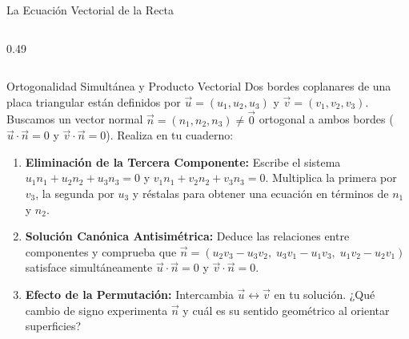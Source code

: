 \documentclass[10pt,aspectratio=169]{beamer}
\begin{document}
\begin{frame}{La Ecuación Vectorial de la Recta}
\begin{columns}[c]
\begin{column}{0.49\textwidth}
    \end{column}
  \end{columns}
\end{frame}

\begin{frame}{Ortogonalidad Simultánea y Producto Vectorial}
  \vspace{0.05cm}
  Dos bordes coplanares de una placa triangular están definidos por $\vec{u} = (u_1, u_2, u_3)$ y $\vec{v} = (v_1, v_2, v_3)$. Buscamos un vector normal $\vec{n} = (n_1, n_2, n_3) \neq \vec{0}$ ortogonal a ambos bordes ($\vec{u}\cdot\vec{n} = 0$ y $\vec{v}\cdot\vec{n} = 0$). Realiza en tu cuaderno:
  \vspace{0.25cm}
  \begin{enumerate}\itemsep10pt
    \item[(a)] \textbf{Eliminación de la Tercera Componente:} Escribe el sistema $u_1 n_1 + u_2 n_2 + u_3 n_3 = 0$ y $v_1 n_1 + v_2 n_2 + v_3 n_3 = 0$. Multiplica la primera por $v_3$, la segunda por $u_3$ y réstalas para obtener una ecuación en términos de $n_1$ y $n_2$.
    \item[(b)] \textbf{Solución Canónica Antisimétrica:} Deduce las relaciones entre componentes y comprueba que $\vec{n} = (u_2 v_3 - u_3 v_2,\; u_3 v_1 - u_1 v_3,\; u_1 v_2 - u_2 v_1)$ satisface simultáneamente $\vec{u}\cdot\vec{n} = 0$ y $\vec{v}\cdot\vec{n} = 0$.
    \item[(c)] \textbf{Efecto de la Permutación:} Intercambia $\vec{u} \leftrightarrow \vec{v}$ en tu solución. ¿Qué cambio de signo experimenta $\vec{n}$ y cuál es su sentido geométrico al orientar superficies?
  \end{enumerate}
\end{frame}
\end{document}
